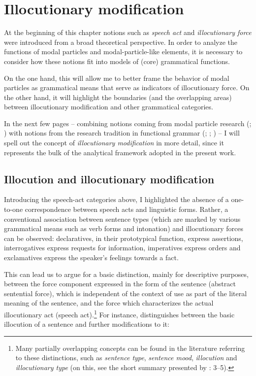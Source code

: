 \section{Illocutionary modification}
\hypertarget{Toc124860623}{}
At the beginning of this chapter notions such as \textit{speech act} and \textit{illocutionary force} were introduced from a broad theoretical perspective. In order to analyze the functions of modal particles and modal-particle-like elements, it is necessary to consider how these notions fit into models of (core) grammatical functions.

On the one hand, this will allow me to better frame the behavior of modal particles as grammatical means that serve as indicators of illocutionary force. On the other hand, it will highlight the boundaries (and the overlapping areas) between illocutionary modification and other grammatical categories.

In the next few pages – combining notions coming from modal particle research (\citealt{Waltereit2001,Waltereit2006}; \citealt{Coniglio2012}) with notions from the research tradition in functional grammar (\citealt{Hengeveld2004}; \citealt{HengeveldMackenzie2008}; \citealt{Narrog2012}) – I will spell out the concept of \textit{illocutionary modification} in more detail, since it represents the bulk of the analytical framework adopted in the present work.

\subsection{Illocution and illocutionary modification}
\hypertarget{Toc124860624}{}
Introducing the speech-act categories above, I highlighted the absence of a one-to-one correspondence between speech acts and linguistic forms. Rather, a conventional association between sentence types (which are marked by various grammatical means such as verb forms and intonation) and illocutionary forces can be observed: declaratives, in their prototypical function, express assertions, interrogatives express requests for information, imperatives express orders and exclamatives express the speaker’s feelings towards a fact.

This can lead us to argue for a basic distinction, mainly for descriptive purposes, between the force component expressed in the form of the sentence (abstract sentential force), which is independent of the context of use as part of the literal meaning of the sentence, and the force which characterizes the actual illocutionary act (speech act).\footnote{Many partially overlapping concepts can be found in the literature referring to these distinctions, such as \textit{sentence type}, \textit{sentence mood}, \textit{illocution} and \textit{illocutionary type} (on this, see the short summary presented by \citealt{AlmEtAl2018}: 3–5).} For instance, \citet{Hengeveld2004} distinguishes between the basic illocution of a sentence and further modifications to it:

